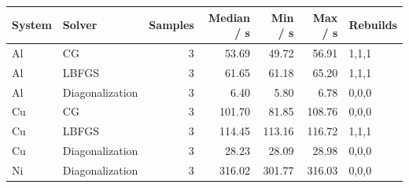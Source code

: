 \begin{tabular}{llrrrrl}\toprule
System & Solver & Samples & Median / s & Min / s & Max / s & Rebuilds\\\midrule
Al & CG & 3 & 53.69 & 49.72 & 56.91 & 1,1,1\\
Al & LBFGS & 3 & 61.65 & 61.18 & 65.20 & 1,1,1\\
Al & Diagonalization & 3 & 6.40 & 5.80 & 6.78 & 0,0,0\\
Cu & CG & 3 & 101.70 & 81.85 & 108.76 & 0,0,0\\
Cu & LBFGS & 3 & 114.45 & 113.16 & 116.72 & 1,1,1\\
Cu & Diagonalization & 3 & 28.23 & 28.09 & 28.98 & 0,0,0\\
Ni & Diagonalization & 3 & 316.02 & 301.77 & 316.03 & 0,0,0\\
\bottomrule\end{tabular}
